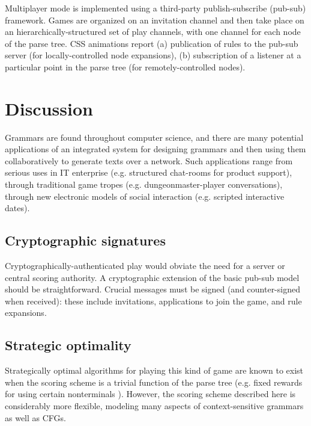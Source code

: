 \documentclass{acm_proc_article-sp}
\begin{document}
Multiplayer mode is implemented using a third-party publish-subscribe (pub-sub) framework.
Games are organized on an invitation channel and then take place on an hierarchically-structured
set of play channels, with one channel for each node of the parse tree.
CSS animations report
 (a) publication of rules to the pub-sub server (for locally-controlled node expansions),
 (b) subscription of a listener at a particular point in the parse tree (for remotely-controlled nodes).

\section{Discussion}

Grammars are found throughout computer science,
and there are many potential applications of an
integrated system for designing grammars and then using them collaboratively to generate texts over a network.
Such applications range from
serious uses in IT enterprise (e.g. structured chat-rooms for product support),
through traditional game tropes (e.g. dungeonmaster-player conversations),
through new electronic models of social interaction (e.g. scripted interactive dates).


\subsection{Cryptographic signatures}

Cryptographically-authenticated play would obviate the need for a server or central scoring authority.
A cryptographic extension of the basic pub-sub model should be straightforward.
Crucial messages must be signed (and counter-signed when received):
these include invitations, applications to join the game, and rule expansions.

\subsection{Strategic optimality}

Strategically optimal algorithms for playing this kind of game are known to exist when the scoring scheme is a trivial function of the parse tree (e.g. fixed rewards for using certain nonterminals \cite{DBLP:conf/icalp/EtessamiWY08}).
However, the scoring scheme described here is considerably more flexible, modeling many aspects of context-sensitive grammars as well as CFGs.
\end{document}
